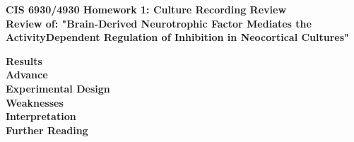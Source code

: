 \documentclass[11pt]{article}
\begin{document}
\begin{center}
{\large {\bf CIS 6930/4930 Homework 1: Culture Recording Review}}\\
{\normalsize {\bf Review of: "Brain-Derived Neurotrophic Factor Mediates the ActivityDependent
Regulation of Inhibition in Neocortical Cultures"}}
\end{center}

\textbf{Results} \\

\textbf{Advance} \\

\textbf{Experimental Design} \\

\textbf{Weaknesses} \\

\textbf{Interpretation} \\

\textbf{Further Reading} \\
\end{document}
